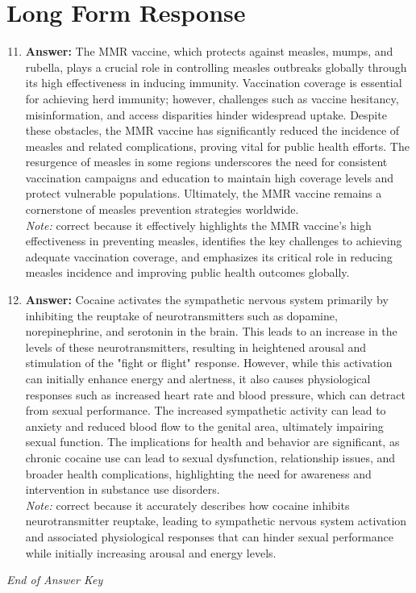 \documentclass[12pt]{article}
\begin{document}
\section*{Long Form Response}
\begin{enumerate}[label=\arabic*.]
\setcounter{enumi}{10}
\item \textbf{Answer:} The MMR vaccine, which protects against measles, mumps, and rubella, plays a crucial role in controlling measles outbreaks globally through its high effectiveness in inducing immunity. Vaccination coverage is essential for achieving herd immunity; however, challenges such as vaccine hesitancy, misinformation, and access disparities hinder widespread uptake. Despite these obstacles, the MMR vaccine has significantly reduced the incidence of measles and related complications, proving vital for public health efforts. The resurgence of measles in some regions underscores the need for consistent vaccination campaigns and education to maintain high coverage levels and protect vulnerable populations. Ultimately, the MMR vaccine remains a cornerstone of measles prevention strategies worldwide.
\\ \textit{Note:} correct because it effectively highlights the MMR vaccine's high effectiveness in preventing measles, identifies the key challenges to achieving adequate vaccination coverage, and emphasizes its critical role in reducing measles incidence and improving public health outcomes globally.
\item \textbf{Answer:} Cocaine activates the sympathetic nervous system primarily by inhibiting the reuptake of neurotransmitters such as dopamine, norepinephrine, and serotonin in the brain. This leads to an increase in the levels of these neurotransmitters, resulting in heightened arousal and stimulation of the "fight or flight" response. However, while this activation can initially enhance energy and alertness, it also causes physiological responses such as increased heart rate and blood pressure, which can detract from sexual performance. The increased sympathetic activity can lead to anxiety and reduced blood flow to the genital area, ultimately impairing sexual function. The implications for health and behavior are significant, as chronic cocaine use can lead to sexual dysfunction, relationship issues, and broader health complications, highlighting the need for awareness and intervention in substance use disorders.
\\ \textit{Note:} correct because it accurately describes how cocaine inhibits neurotransmitter reuptake, leading to sympathetic nervous system activation and associated physiological responses that can hinder sexual performance while initially increasing arousal and energy levels.
\end{enumerate}

\vfill
\noindent\textit{End of Answer Key}
\end{document}
